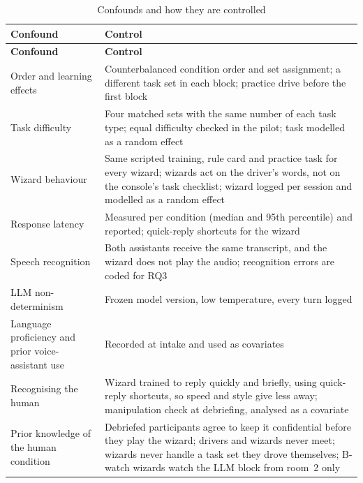 \documentclass[
    a4paper,
    11pt,
    DIV=11,
    bigheadings,
    idxtotoc,
    listof=totoc,
    bibtotoc,
    halfparskip,
    cleardoubleempty,
    openright,
    oneside
]{scrartcl}
\begin{document}
{\small
\begin{longtable}{>{\raggedright\arraybackslash}p{4.2cm} >{\raggedright\arraybackslash}p{10.7cm}}
    \caption{Confounds and how they are controlled}\label{tab:confounds}\\
    \toprule
    \textbf{Confound} & \textbf{Control} \\
    \midrule
    \endfirsthead
    \toprule
    \textbf{Confound} & \textbf{Control} \\
    \midrule
    \endhead
    Order and learning effects & Counterbalanced condition order and set assignment; a different task set in each block; practice drive before the first block \\
    Task difficulty & Four matched sets with the same number of each task type; equal difficulty checked in the pilot; task modelled as a random effect \\
    Wizard behaviour & Same scripted training, rule card and practice task for every wizard; wizards act on the driver's words, not on the console's task checklist; wizard logged per session and modelled as a random effect \cite{Riek12Wizard} \\
    Response latency & Measured per condition (median and 95th percentile) and reported; quick-reply shortcuts for the wizard \\
    Speech recognition & Both assistants receive the same transcript, and the wizard does not play the audio; recognition errors are coded for RQ3 \\
    LLM non-determinism & Frozen model version, low temperature, every turn logged \\
    Language proficiency and prior voice-assistant use & Recorded at intake and used as covariates \\
    Recognising the human & Wizard trained to reply quickly and briefly, using quick-reply shortcuts, so speed and style give less away; manipulation check at debriefing, analysed as a covariate \\
    Prior knowledge of the human condition & Debriefed participants agree to keep it confidential before they play the wizard; drivers and wizards never meet; wizards never handle a task set they drove themselves; B-watch wizards watch the LLM block from room~2 only \\
    \bottomrule
\end{longtable}
}
\end{document}
